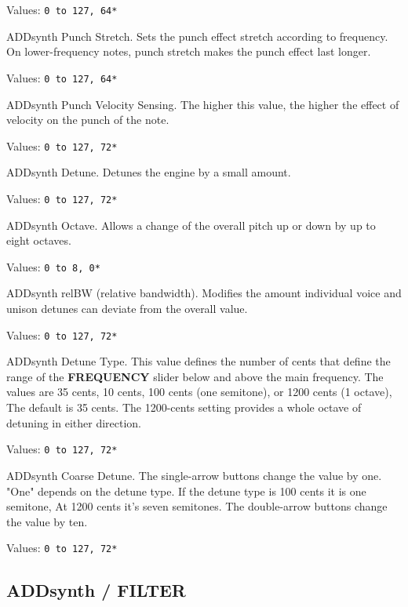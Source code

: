    Values: \texttt{0 to 127, 64*}

   ADDsynth Punch Stretch.
   Sets the punch effect stretch according to frequency. On lower-frequency
   notes, punch stretch makes the punch effect last longer.

   Values: \texttt{0 to 127, 64*}

   ADDsynth Punch Velocity Sensing.
   The higher this value, the higher the effect of velocity on the punch of
   the note.

   Values: \texttt{0 to 127, 72*}

   ADDsynth Detune.
   Detunes the engine by a small amount.

   Values: \texttt{0 to 127, 72*}

   ADDsynth Octave.
   Allows a change of the overall pitch up or down by up to eight octaves.

   Values: \texttt{0 to 8, 0*}

   ADDsynth relBW (relative bandwidth).
   Modifies the amount individual voice and unison detunes can deviate
   from the overall value.

   Values: \texttt{0 to 127, 72*}

   ADDsynth Detune Type.
   This value defines the number of cents that define the range of the
   \textbf{FREQUENCY} slider below and above the main frequency.
   The values are 35 cents, 10 cents, 100 cents (one semitone), or
   1200 cents (1 octave),  The default is 35 cents.  The 1200-cents
   setting provides a whole octave of detuning in either direction.


   Values: \texttt{0 to 127, 72*}

   ADDsynth Coarse Detune.
   The single-arrow buttons change the value by one.
   "One" depends on the detune type.
   If the detune type is 100 cents it is one semitone,
   At 1200 cents it's seven semitones.
   The double-arrow buttons change the value by ten.

   Values: \texttt{0 to 127, 72*}

\subsection{ADDsynth / FILTER}
\label{subsec:addsynth_filter}

